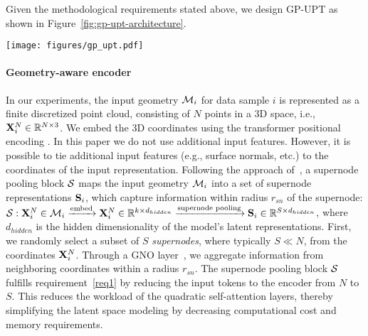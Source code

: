 Given the methodological requirements stated above,
we design \ac{GP-UPT} as shown in Figure~\ref{fig:gp-upt-architecture}.
\begin{figure*}[t!]
    \centering
    \texttt{[image: figures/gp\_upt.pdf]}
    \caption{Architecture overview of the \acl{GP-UPT}.}
    \label{fig:gp-upt-architecture}
\end{figure*}

\paragraph{Geometry-aware encoder} In our experiments, the input geometry $\mathcal{M}_{i}$ for data sample $i$ is represented as a finite discretized point cloud, consisting of $N$ points in a 3D space, i.e., $\mathbf{X}^{N}_{i} \in \mathbb{R}^{N \times 3}$.
We embed the 3D coordinates using the transformer positional encoding \cite{Vaswani:17}. 
In this paper we do not use additional input features.
However, it is possible to tie additional input features (e.g., surface normals, etc.) to the coordinates of the input representation.
Following the approach of~\citet{alkin2024universal}, a supernode pooling block $\mathcal{S}$ maps the input geometry $\mathcal{M}_{i}$ into a set of supernode representations $\mathbf{S}_{i}$, which capture information within radius $r_{sn}$ of the supernode: 
$\mathcal{S}: \mathbf{X}^{N}_{i} \in \mathcal{M}_{i} \xrightarrow[]{\text{embed}} \mathbf{X}^{N}_{i} \in \mathbb{R}^{k\times d_{hidden}} \xrightarrow[]{\text{supernode pooling}} \mathbf{S}_{i} \in \mathbb{R}^{S \times d_{hidden}}$, where $d_{hidden}$ is the hidden dimensionality of the model's latent representations. 
First, we randomly select a subset of $S$ \emph{supernodes}, where typically $S \ll N$, from the coordinates $\mathbf{X}^{N}_{i}$.
Through a \ac{GNO} layer~\citep{Li:20graph}, we aggregate information from neighboring coordinates within a radius $r_{sn}$.
The supernode pooling block $\mathcal{S}$ fulfills requirement~\ref{req1}
by reducing the input tokens to the encoder from $N$ to $S$. 
This reduces the workload of the quadratic self-attention layers, thereby simplifying the latent space modeling by decreasing computational cost and memory requirements. 


